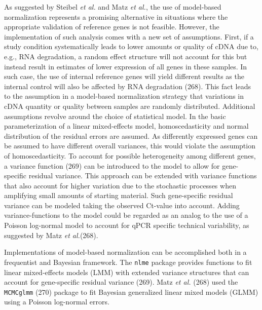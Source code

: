 \documentclass[twoside,10pt]{gihclass} %
\begin{document}
As suggested by Steibel \emph{et al.} and Matz \emph{et al.}, the use of model-based normalization represents a promising alternative in situations where the appropriate validation of reference genes is not feasible.
However, the implementation of such analysis comes with a new set of assumptions.
First, if a study condition systematically leads to lower amounts or quality of cDNA due to, e.g., RNA degradation, a random effect structure will not account for this but instead result in estimates of lower expression of all genes in these samples. In such case, the use of internal reference genes will yield different results as the internal control will also be affected by RNA degradation
(268).
This fact leads to the assumption in a model-based normalization strategy that variations in cDNA quantity or quality between samples are randomly distributed.
Additional assumptions revolve around the choice of statistical model.
In the basic parameterization of a linear mixed-effects model, homoscedasticity and normal distribution of the residual errors are assumed.
As differently expressed genes can be assumed to have different overall variances, this would violate the assumption of homoscedasticity. To account for possible heterogeneity among different genes, a variance function
(269)
can be introduced to the model to allow for gene-specific residual variance. This approach can be extended with variance functions that also account for higher variation due to the stochastic processes when amplifying small amounts of starting material.
Such gene-specific residual variance can be modeled taking the observed Ct-value into account.
Adding variance-functions to the model could be regarded as an analog to the use of a Poisson log-normal model to account for qPCR specific technical variability, as suggested by Matz \emph{et al.}(268).

Implementations of model-based normalization can be accomplished both in a frequentist and Bayesian framework.
The \texttt{nlme} package provides functions to fit linear mixed-effects models (LMM) with extended variance structures that can account for gene-specific residual variance (269).
Matz \emph{et al.} (268) used the \texttt{MCMCglmm} (270) package to fit Bayesian generalized linear mixed models (GLMM) using a Poisson log-normal errors.
\end{document}
